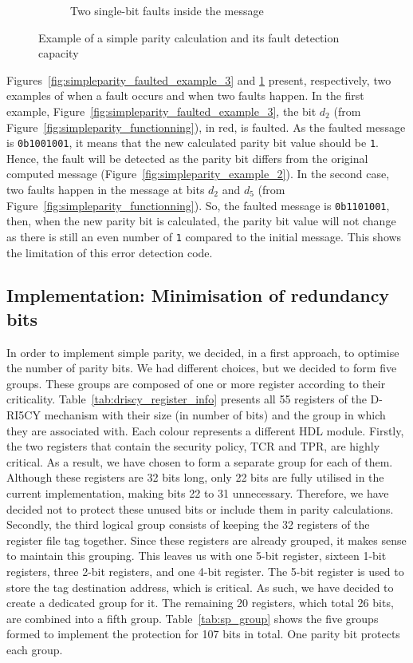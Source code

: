 \begin{figure}[ht]
\begin{subfigure}[b]{0.49\textwidth}
        \caption{Two single-bit faults inside the message}
        \label{fig:simpleparity_faulted_example_4}
    \end{subfigure}
    \caption{Example of a simple parity calculation and its fault detection capacity}
    \label{fig:simpleparity_example}
\end{figure}

Figures~\ref{fig:simpleparity_faulted_example_3} and \ref{fig:simpleparity_faulted_example_4} present, respectively, two examples of when a fault occurs and when two faults happen.
In the first example, Figure~\ref{fig:simpleparity_faulted_example_3}, the bit $d_2$ (from Figure~\ref{fig:simpleparity_functionning}), in red, is faulted. As the faulted message is \texttt{0b1001001}, it means that the new calculated parity bit value should be \texttt{1}. Hence, the fault will be detected as the parity bit differs from the original computed message (Figure~\ref{fig:simpleparity_example_2}).
In the second case, two faults happen in the message at bits $d_2$ and $d_5$ (from Figure~\ref{fig:simpleparity_functionning}). So, the faulted message is \texttt{0b1101001}, then, when the new parity bit is calculated, the parity bit value will not change as there is still an even number of \texttt{1} compared to the initial message. This shows the limitation of this error detection code.

\subsection{Implementation: Minimisation of redundancy bits}

In order to implement simple parity, we decided, in a first approach, to optimise the number of parity bits. We had different choices, but we decided to form five groups. These groups are composed of one or more register according to their criticality. Table~\ref{tab:driscy_register_info} presents all 55 registers of the D-RI5CY mechanism with their size (in number of bits) and the group in which they are associated with. Each colour represents a different HDL module.
Firstly, the two registers that contain the security policy, TCR and TPR, are highly critical. As a result, we have chosen to form a separate group for each of them. Although these registers are 32 bits long, only 22 bits are fully utilised in the current implementation, making bits 22 to 31 unnecessary. Therefore, we have decided not to protect these unused bits or include them in parity calculations.
Secondly, the third logical group consists of keeping the 32 registers of the register file tag together. Since these registers are already grouped, it makes sense to maintain this grouping.
This leaves us with one 5-bit register, sixteen 1-bit registers, three 2-bit registers, and one 4-bit register. The 5-bit register is used to store the tag destination address, which is critical. As such, we have decided to create a dedicated group for it. The remaining 20 registers, which total 26 bits, are combined into a fifth group.
Table~\ref{tab:sp_group} shows the five groups formed to implement the protection for 107 bits in total. One parity bit protects each group.

